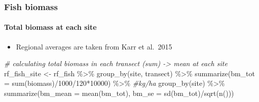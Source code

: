 \documentclass[
]{article}
\newenvironment{Shaded}{\begin{snugshade}}{\end{snugshade}}
\newcommand{\AttributeTok}[1]{\textcolor[rgb]{0.77,0.63,0.00}{#1}}
\newcommand{\CommentTok}[1]{\textcolor[rgb]{0.56,0.35,0.01}{\textit{#1}}}
\newcommand{\DecValTok}[1]{\textcolor[rgb]{0.00,0.00,0.81}{#1}}
\newcommand{\FunctionTok}[1]{\textcolor[rgb]{0.00,0.00,0.00}{#1}}
\newcommand{\NormalTok}[1]{#1}
\newcommand{\OtherTok}[1]{\textcolor[rgb]{0.56,0.35,0.01}{#1}}
\newcommand{\SpecialCharTok}[1]{\textcolor[rgb]{0.00,0.00,0.00}{#1}}
\providecommand{\tightlist}{%
  \setlength{\itemsep}{0pt}\setlength{\parskip}{0pt}}
\begin{document}
\hypertarget{fish-biomass}{%
\subsubsection{Fish biomass}\label{fish-biomass}}

\hypertarget{total-biomass-at-each-site}{%
\paragraph{Total biomass at each
site}\label{total-biomass-at-each-site}}

\begin{itemize}
\tightlist
\item
  Regional averages are taken from Karr et al.~2015
\end{itemize}

\begin{Shaded}
\begin{Highlighting}[]
\CommentTok{\# calculating total biomass in each transect (sum) {-}\textgreater{} mean at each site}
\NormalTok{rf\_fish\_site }\OtherTok{\textless{}{-}}\NormalTok{ rf\_fish }\SpecialCharTok{\%\textgreater{}\%} 
  \FunctionTok{group\_by}\NormalTok{(site, transect) }\SpecialCharTok{\%\textgreater{}\%}
  \FunctionTok{summarize}\NormalTok{(}\AttributeTok{bm\_tot =} \FunctionTok{sum}\NormalTok{(biomass)}\SpecialCharTok{/}\DecValTok{1000}\SpecialCharTok{/}\DecValTok{120}\SpecialCharTok{*}\DecValTok{10000}\NormalTok{) }\SpecialCharTok{\%\textgreater{}\%} \CommentTok{\#kg/ha}
  \FunctionTok{group\_by}\NormalTok{(site) }\SpecialCharTok{\%\textgreater{}\%}
  \FunctionTok{summarize}\NormalTok{(}\AttributeTok{bm\_mean =} \FunctionTok{mean}\NormalTok{(bm\_tot),}
            \AttributeTok{bm\_se =} \FunctionTok{sd}\NormalTok{(bm\_tot)}\SpecialCharTok{/}\FunctionTok{sqrt}\NormalTok{(}\FunctionTok{n}\NormalTok{()))}
\end{Highlighting}
\end{Shaded}
\end{document}
